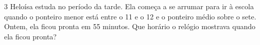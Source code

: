 \num{3} Heloísa estuda no período da tarde. Ela começa a se arrumar para ir à escola 
quando o ponteiro menor está entre o 11 e o 12 e o ponteiro médio sobre o sete. Ontem,
ela ficou pronta em 55 minutos. Que horário o relógio mostrava quando ela ficou pronta?

